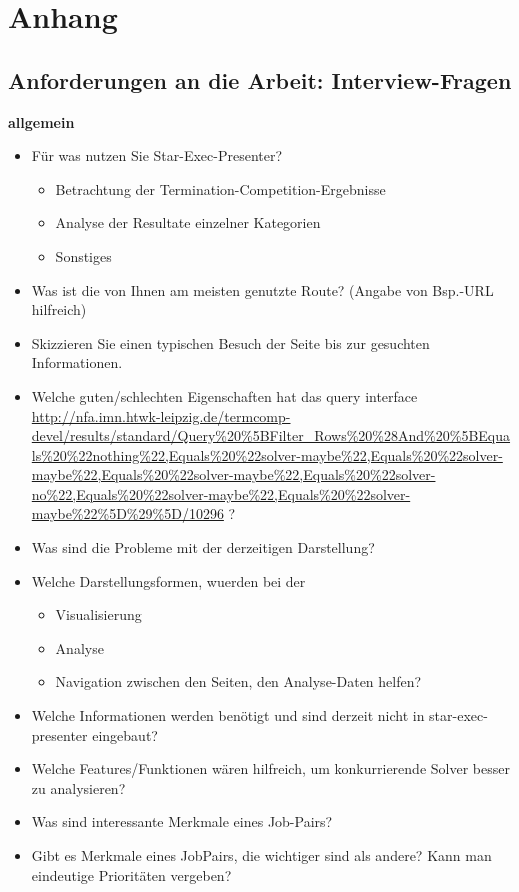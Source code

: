 \chapter{Anhang}\label{anhang}

\section{\texorpdfstring{Anforderungen an die Arbeit:
Interview-Fragen\label{Anhang_Interview_Fragen}}{Anforderungen an die Arbeit: Interview-Fragen}}\label{anforderungen-an-die-arbeit-interview-fragen}

\textbf{allgemein}

\begin{itemize}
\item
  Für was nutzen Sie Star-Exec-Presenter?

  \begin{itemize}
  \tightlist
  \item
    Betrachtung der Termination-Competition-Ergebnisse
  \item
    Analyse der Resultate einzelner Kategorien
  \item
    Sonstiges
  \end{itemize}
\item
  Was ist die von Ihnen am meisten genutzte Route? (Angabe von Bsp.-URL
  hilfreich)
\item
  Skizzieren Sie einen typischen Besuch der Seite bis zur gesuchten
  Informationen.
\item
  Welche guten/schlechten Eigenschaften hat das query interface
  \url{http://nfa.imn.htwk-leipzig.de/termcomp-devel/results/standard/Query%20%5BFilter_Rows%20%28And%20%5BEquals%20%22nothing%22,Equals%20%22solver-maybe%22,Equals%20%22solver-maybe%22,Equals%20%22solver-maybe%22,Equals%20%22solver-no%22,Equals%20%22solver-maybe%22,Equals%20%22solver-maybe%22%5D%29%5D/10296}
  ?
\item
  Was sind die Probleme mit der derzeitigen Darstellung?
\item
  Welche Darstellungsformen, wuerden bei der

  \begin{itemize}
  \tightlist
  \item
    Visualisierung
  \item
    Analyse
  \item
    Navigation zwischen den Seiten, den Analyse-Daten helfen?
  \end{itemize}
\item
  Welche Informationen werden benötigt und sind derzeit nicht in
  star-exec-presenter eingebaut?
\item
  Welche Features/Funktionen wären hilfreich, um konkurrierende Solver
  besser zu analysieren?
\item
  Was sind interessante Merkmale eines Job-Pairs?
\item
  Gibt es Merkmale eines JobPairs, die wichtiger sind als andere? Kann
  man eindeutige Prioritäten vergeben?


\end{itemize}
